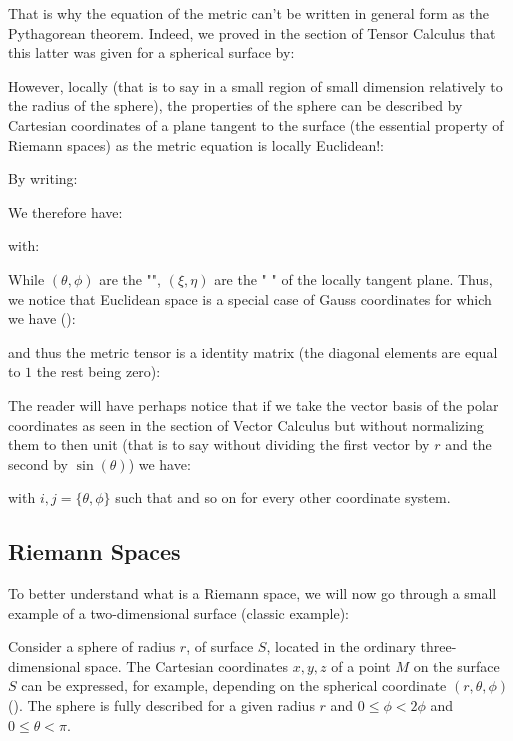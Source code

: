 	That is why the equation of the metric can't be written in general form as the Pythagorean theorem. Indeed, we proved in the section of Tensor Calculus that this latter was given for a spherical surface by:
	
	However, locally (that is to say in a small region of small dimension relatively to the radius of the sphere), the properties of the sphere can be described by Cartesian coordinates of a plane tangent to the surface (the essential property of Riemann spaces) as the metric equation is locally Euclidean!:
	
	By writing:
	
	We therefore have:
	
	with:
	
	While $(\theta,\phi)$ are the "",  $(\xi,\eta)$ are the " \label{riemann coordinates}" of the locally tangent plane. Thus, we notice that Euclidean space is a special case of Gauss coordinates for which we have ():
	
	and thus the metric tensor is a identity matrix (the diagonal elements are equal to $1$ the rest being zero):
	
	The reader will have perhaps notice that if we take the vector basis of the polar coordinates as seen in the section of Vector Calculus but without normalizing them to then unit (that is to say without dividing the first vector by $r$ and the second by $\sin(\theta)$) we have:
	
	with $i,j=\{\theta,\phi\}$ such that and so on for every other coordinate system.
	
	\pagebreak
	\subsection{Riemann Spaces}\label{riemann spaces}
	To better understand what is a Riemann space, we will now go through a small example of a two-dimensional surface (classic example):
	
	Consider a sphere of radius $r$, of surface $S$, located in the ordinary three-dimensional space. The Cartesian coordinates $x, y, z$ of a point $M$ on the surface $S$ can be expressed, for example, depending on the spherical coordinate $(r,\theta,\phi)$ (). The sphere is fully described for a given radius $r$ and $0\leq \phi < 2\phi$ and $0 \leq \theta < \pi$.
	
